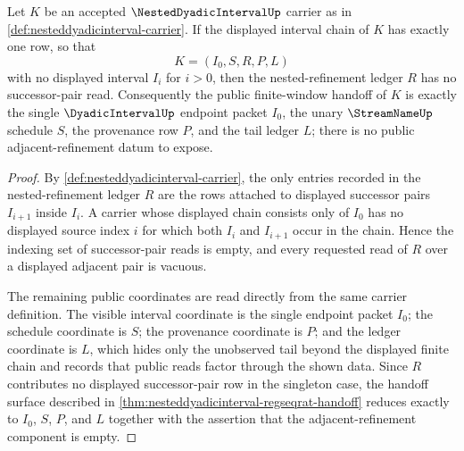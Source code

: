 \begin{theorem}
\label{thm:nesteddyadicinterval-singleton-chain-vacuity}
Let $K$ be an accepted $\NestedDyadicIntervalUp$ carrier as in \autoref{def:nesteddyadicinterval-carrier}. If the displayed interval chain of $K$ has exactly one row, so that
$$
K=(I_0,S,R,P,L)
$$
with no displayed interval $I_i$ for $i>0$, then the nested-refinement ledger $R$ has no successor-pair read. Consequently the public finite-window handoff of $K$ is exactly the single $\DyadicIntervalUp$ endpoint packet $I_0$, the unary $\StreamNameUp$ schedule $S$, the provenance row $P$, and the tail ledger $L$; there is no public adjacent-refinement datum to expose.
\end{theorem}
\begin{proof}
By \autoref{def:nesteddyadicinterval-carrier}, the only entries recorded in the nested-refinement ledger $R$ are the rows attached to displayed successor pairs $I_{i+1}$ inside $I_i$. A carrier whose displayed chain consists only of $I_0$ has no displayed source index $i$ for which both $I_i$ and $I_{i+1}$ occur in the chain. Hence the indexing set of successor-pair reads is empty, and every requested read of $R$ over a displayed adjacent pair is vacuous.

The remaining public coordinates are read directly from the same carrier definition. The visible interval coordinate is the single endpoint packet $I_0$; the schedule coordinate is $S$; the provenance coordinate is $P$; and the ledger coordinate is $L$, which hides only the unobserved tail beyond the displayed finite chain and records that public reads factor through the shown data. Since $R$ contributes no displayed successor-pair row in the singleton case, the handoff surface described in \autoref{thm:nesteddyadicinterval-regseqrat-handoff} reduces exactly to $I_0$, $S$, $P$, and $L$ together with the assertion that the adjacent-refinement component is empty.
\end{proof}

